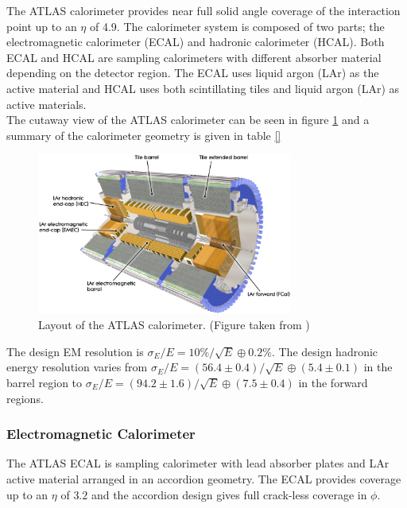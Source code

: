 \indent The ATLAS calorimeter provides near full solid angle coverage of the interaction point up to an $\eta$ of 4.9.  The calorimeter system is composed of two parts; the electromagnetic calorimeter (ECAL) and hadronic calorimeter (HCAL).  Both ECAL and HCAL are sampling calorimeters with different absorber material depending on the detector region.  The ECAL uses liquid argon (LAr) as the active material and HCAL uses both scintillating tiles and liquid argon (LAr) as active materials.  \\

\indent The cutaway view of the ATLAS calorimeter can be seen in figure \ref{LHC:fig:ATLASCalo} and a summary of the calorimeter geometry is given in table \ref{} \\

\begin{figure}[h!]
\centering
\includegraphics[width=0.75\textwidth, angle=0]{figures/LHC_ATLAS/Calorimeter_d3.eps}
\caption[Layout of the ATLAS calorimeter]{ Layout of the ATLAS calorimeter. (Figure taken from \cite{ATLAS_JINST}) \label{LHC:fig:ATLASCalo}}
\end{figure}

\indent The design EM resolution is $\sigma_E/E = 10\%/\sqrt{E} \oplus 0.2\%$. The design hadronic energy resolution varies from $\sigma_E/E = (56.4\pm0.4)/\sqrt{E}\oplus(5.4\pm0.1)$ in the barrel region to $\sigma_E/E = (94.2\pm1.6)/\sqrt{E}\oplus(7.5\pm0.4)$ in the forward regions. \\

\subsubsection*{Electromagnetic Calorimeter}

\indent The ATLAS ECAL is sampling calorimeter with lead absorber plates and LAr active material arranged in an accordion geometry.  The ECAL provides coverage up to an $\eta$ of $3.2$ and the accordion design gives full crack-less coverage in $\phi$. \\%

